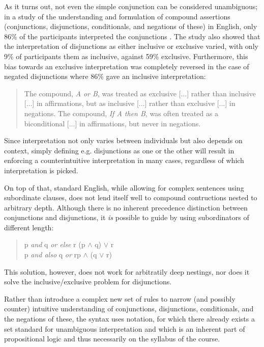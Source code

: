 \documentclass[BA.tex]{subfiles}
\begin{document}
 As it turns out, not even the simple conjunction can be considered 
 unambiguous; in a study\cite{negation} of the understanding and
 formulation of compound assertions (conjunctions, disjunctions, 
 conditionals, and negations of these) in English, only 86\% of the
 participants interpreted the conjunctions \cite[p.~4]{negation}. The study also
 showed that the interpretation of disjunctions as either
 inclusive or exclusive varied, with only 9\% of participants 
 them as inclusive, against 59\% exclusive\cite[\emph{ibid.}]{negation}.
 Furthermore, this bias towards an exclusive interpretation was completely
 reversed in the case of negated disjunctions where 86\% gave an inclusive
 interpretation:
 \begin{quote}
 The compound, \emph{A or B},
 was treated as exclusive [...] rather than inclusive [...]
 in affirmations, but as inclusive [...] rather than exclusive [...] 
 in negations. The compound, \emph{If A then B}, was
 often treated as a biconditional [...] in affirmations, but
 never in negations.\cite[p.~5]{negation}
 \end{quote}
 Since interpretation not only varies between individuals but also 
 depends on context, simply defining e.g. disjunctions as one or the other
 will result in enforcing a counterintuitive interpretation in many cases,
 regardless of which interpretation is picked.
 
 On top of that, standard English, while allowing for
 complex sentences using subordinate clauses, does not lend itself well to
 compound contructions nested to arbitrary depth. Although there is no 
 inherent precedence distinction between conjunctions and disjunctions, it
 \emph{is} possible to guide  by using 
 subordinators of different length:
 \begin{quote}
 \ttfamily
    p \emph{and} q \emph{or else} r \hfill (p \(\land\) q) \(\lor\) r~ \\
    p \emph{and also} q \emph{or} r\hfill p \(\land\) (q \(\lor\) r)
 \end{quote}
 This solution, however, does not work for arbitratily deep nestings, nor
 does it solve the inclusive/exclusive problem for disjunctions.

 Rather than introduce a complex new set of rules to narrow (and possibly
 counter) intuitive understanding of conjunctions, disjunctions,
 conditionals, and the negations of these, the syntax uses
  notation, for which there already exists a set standard
 for unambiguous interpretation and which is an inherent part of
 propositional logic and thus necessarily on the syllabus of the course.
\end{document}
